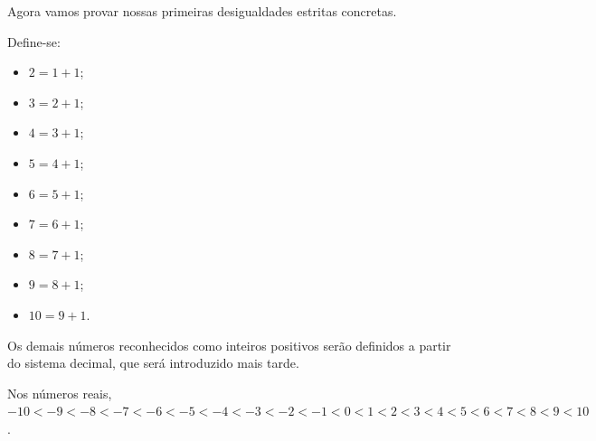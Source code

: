 Agora vamos provar nossas primeiras desigualdades estritas concretas.
\begin{definition}
    Define-se:
    \begin{itemize}
        \item $2=1+1$;
        \item $3=2+1$;
        \item $4=3+1$;
        \item $5=4+1$;
        \item $6=5+1$;
        \item $7=6+1$;
        \item $8=7+1$;
        \item $9=8+1$;
        \item $10=9+1$.
    \end{itemize}
\end{definition}
Os demais números reconhecidos como inteiros positivos serão definidos a partir do sistema decimal, que será introduzido mais tarde.
\begin{proposition}
    Nos números reais, $-10<-9<-8<-7<-6<-5<-4<-3<-2<-1<0<1<2<3<4<5<6<7<8<9<10$.
\end{proposition}
